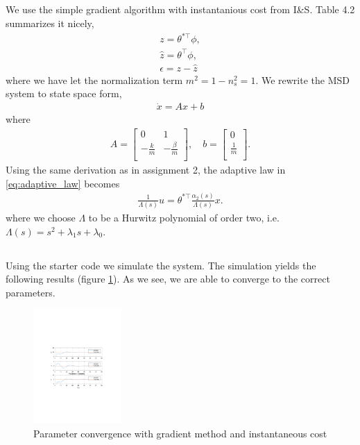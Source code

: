 \documentclass[]{article}
\begin{document}
\subsection{}
We use the simple gradient algorithm with instantanious cost from I\&S. Table 4.2 summarizes it nicely,
\begin{align}
\label{eq:adaptive_law}
z = \theta^{*\top}\phi, \\
\hat z = \theta^\top \phi, \\
\epsilon = z - \hat z
\end{align}
where we have let the normalization term $m^2 = 1 - n_s^2 = 1$.
We rewrite the MSD system to state space form,
\begin{equation}\begin{aligned}
\dot x = Ax + b
\end{aligned}\end{equation}
where
\begin{equation}\begin{aligned}
A =
\begin{bmatrix}
0 & 1 \\
-\frac{k}{m} & -\frac{\beta}{m} \\
\end{bmatrix}, \quad
b = \begin{bmatrix}
0\\
\frac{1}{m}\\
\end{bmatrix}.
\end{aligned}\end{equation}
Using the same derivation as in assignment 2, the adaptive law in \eqref{eq:adaptive_law} becomes
\begin{equation}\begin{aligned}
\frac{1}{\Lambda(s)}u = \theta^{*\top}\frac{\alpha_2(s)}{\Lambda(s)}x.
\end{aligned}\end{equation}
where we choose $\Lambda$ to be a Hurwitz polynomial of order two, i.e. $\Lambda(s) = s^2 + \lambda_1 s + \lambda_0$.

\setcounter{subsection}{3}
\subsection{}
Using the starter code we simulate the system.
The simulation yields the following results (figure \ref{fig:results}). As we see, we are able to converge to the correct parameters.
\begin{figure}[H]
\centering
\includegraphics[width=0.3\textwidth, trim={8cm 8cm 8cm 8cm, clip}]{plots}
\caption{Parameter convergence with gradient method and instantaneous cost}
\label{fig:results}
\end{figure}
\end{document}
